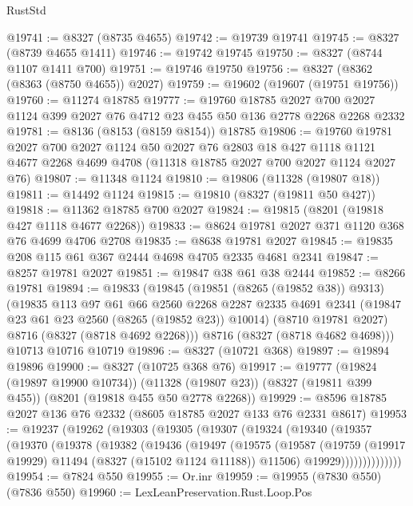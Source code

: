 \begin{lexlean}{RustStd}
\begin{coremodule}
{\begin{coremodule}
{{{{{{{{{{{{{{{{{{{{{{{{{{{{{{{{{{{{{{{{{{{{{{{{{{{{{{@19741 := @8327 (@8735 @4655)
@19742 := @19739 @19741
@19745 := @8327 (@8739 @4655 @1411)
@19746 := @19742 @19745
@19750 := @8327 (@8744 @1107 @1411 @700)
@19751 := @19746 @19750
@19756 := @8327 (@8362 (@8363 (@8750 @4655)) @2027)
@19759 := @19602 (@19607 (@19751 @19756))
@19760 := @11274 @18785
@19777 := @19760
    @18785
    @2027
    @700
    @2027
    @1124
    @399
    @2027
    @76
    @4712
    @23
    @455
    @50
    @136
    @2778
    @2268
    @2268
    @2332
@19781 := @8136 (@8153 (@8159 @8154)) @18785
@19806 := @19760
    @19781
    @2027
    @700
    @2027
    @1124
    @50
    @2027
    @76
    @2803
    @18
    @427
    @1118
    @1121
    @4677
    @2268
    @4699
    @4708
    (@11318 @18785 @2027 @700 @2027 @1124 @2027 @76)
@19807 := @11348 @1124
@19810 := @19806 (@11328 (@19807 @18))
@19811 := @14492 @1124
@19815 := @19810 (@8327 (@19811 @50 @427))
@19818 := @11362 @18785 @700 @2027
@19824 := @19815 (@8201 (@19818 @427 @1118 @4677 @2268))
@19833 := @8624 @19781 @2027 @371 @1120 @368 @76 @4699 @4706 @2708
@19835 := @8638 @19781 @2027
@19845 := @19835 @208 @115 @61 @367 @2444 @4698 @4705 @2335 @4681 @2341
@19847 := @8257 @19781 @2027
@19851 := @19847 @38 @61 @38 @2444
@19852 := @8266 @19781
@19894 := @19833
    (@19845
      (@19851 (@8265 (@19852 @38)) @9313)
      (@19835
        @113
        @97
        @61
        @66
        @2560
        @2268
        @2287
        @2335
        @4691
        @2341
        (@19847 @23 @61 @23 @2560 (@8265 (@19852 @23)) @10014)
        (@8710 @19781 @2027)
        @8716
        (@8327 (@8718 @4692 @2268)))
      @8716
      (@8327 (@8718 @4682 @4698)))
    @10713
    @10716
    @10719
@19896 := @8327 (@10721 @368)
@19897 := @19894 @19896
@19900 := @8327 (@10725 @368 @76)
@19917 := @19777
    (@19824 (@19897 @19900 @10734))
    (@11328 (@19807 @23))
    (@8327 (@19811 @399 @455))
    (@8201 (@19818 @455 @50 @2778 @2268))
@19929 := @8596 @18785 @2027 @136 @76 @2332 (@8605 @18785 @2027 @133 @76 @2331 @8617)
@19953 := @19237
    (@19262
      (@19303
        (@19305
          (@19307
            (@19324
              (@19340
                (@19357
                  (@19370
                    (@19378
                      (@19382
                        (@19436
                          (@19497
                            (@19575
                              (@19587
                                (@19759 (@19917 @19929) @11494 (@8327 (@15102 @1124 @11188)) @11506)
                                @19929))))))))))))))
@19954 := @7824 @550
@19955 := Or.inr
@19959 := @19955 (@7830 @550) (@7836 @550)
@19960 := LexLeanPreservation.Rust.Loop.Pos
}}}}}}}}}}}}}}}}}}}}}}}}}}}}}}}}}}}}}}}}}}}}}}}}}}}}}}
\end{coremodule}}
\end{coremodule}
\end{lexlean}
